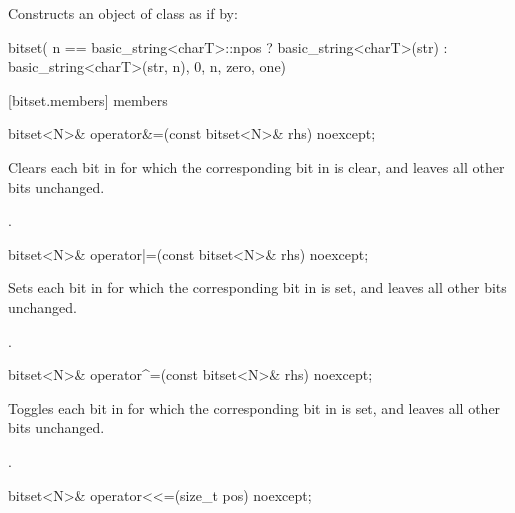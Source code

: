 \begin{itemdescr}
\pnum
\effects Constructs an object of class  as if by:
\begin{codeblock}
bitset(
  n == basic_string<charT>::npos
    ? basic_string<charT>(str)
    : basic_string<charT>(str, n),
  0, n, zero, one)
\end{codeblock}

\end{itemdescr}


[bitset.members]{ members}

%
\begin{itemdecl}
bitset<N>& operator&=(const bitset<N>& rhs) noexcept;
\end{itemdecl}

\begin{itemdescr}
\pnum
\effects
Clears each bit in
for which the corresponding bit in  is clear, and leaves all other bits unchanged.

\pnum
\returns
{}.
\end{itemdescr}

%
\begin{itemdecl}
bitset<N>& operator|=(const bitset<N>& rhs) noexcept;
\end{itemdecl}

\begin{itemdescr}
\pnum
\effects
Sets each bit in
for which the corresponding bit in  is set, and leaves all other bits unchanged.

\pnum
\returns
{}.
\end{itemdescr}

%
\begin{itemdecl}
bitset<N>& operator^=(const bitset<N>& rhs) noexcept;
\end{itemdecl}

\begin{itemdescr}
\pnum
\effects
Toggles each bit in
for which the corresponding bit in  is set, and leaves all other bits unchanged.

\pnum
\returns
{}.
\end{itemdescr}

%
\begin{itemdecl}
bitset<N>& operator<<=(size_t pos) noexcept;
\end{itemdecl}

